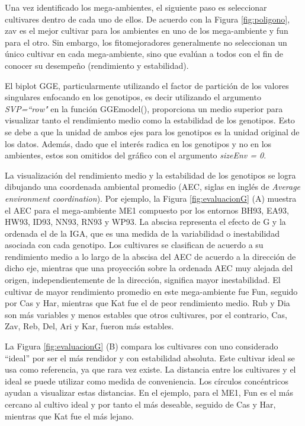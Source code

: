 Una vez identificado los mega-ambientes, el siguiente paso es seleccionar cultivares dentro de cada uno de ellos. De acuerdo con la Figura  \ref{fig:poligono}, zav es el mejor cultivar para los ambientes en uno de los mega-ambiente y fun para el otro. Sin embargo, los fitomejoradores generalmente no seleccionan un único cultivar en cada mega-ambiente, sino que evalúan a todos con el fin de conocer su desempeño (rendimiento y estabilidad).  

El biplot GGE, particularmente utilizando el factor de partición de los valores singulares enfocando en los genotipos, es decir utilizando el argumento \emph{SVP=``row"} en la función \textcolor{fandango}{GGEmodel()}, proporciona un medio superior para visualizar tanto el rendimiento medio como la estabilidad de los genotipos. Esto se debe a que la unidad de ambos ejes para los genotipos es la unidad original de los datos. Además, dado que el interés radica en los genotipos y no en los ambientes, estos son omitidos del gráfico con el argumento \emph{sizeEnv = 0}.

La visualización del rendimiento medio y la estabilidad de los genotipos se logra dibujando una coordenada ambiental promedio (AEC, siglas en inglés de \emph{Average environment coordination}). Por ejemplo, la Figura \ref{fig:evaluacionG} (A)  muestra el AEC para el mega-ambiente ME1 compuesto por los entornos BH93, EA93, HW93, ID93, NN93, RN93 y WP93. La abscisa representa el efecto de G y la ordenada el de la IGA, que es una medida de la variabilidad o inestabilidad asociada con cada genotipo. Los cultivares se clasifican de acuerdo a su rendimiento medio a lo largo de la abscisa del AEC de acuerdo a la dirección de dicho eje, mientras que una proyección sobre la ordenada AEC muy alejada del origen, independientemente de la dirección, significa mayor inestabilidad. El cultivar de mayor rendimiento promedio en este mega-ambiente fue Fun, seguido por Cas y Har, mientras que Kat fue el de peor rendimiento medio. Rub y Dia son más variables y menos estables que otros cultivares, por el contrario, Cas, Zav, Reb, Del, Ari y Kar, fueron más estables. 

La Figura \ref{fig:evaluacionG} (B) compara los cultivares con uno considerado ``ideal” por ser el más rendidor y con estabilidad absoluta. Este cultivar ideal se usa como referencia, ya que rara vez existe. La distancia entre los cultivares y el ideal se puede utilizar como medida de conveniencia. Los círculos concéntricos ayudan a visualizar estas distancias. En el ejemplo, para el ME1, Fun es el más cercano al cultivo ideal y por tanto el más deseable, seguido de Cas y Har, mientras que Kat fue el más lejano. \\


